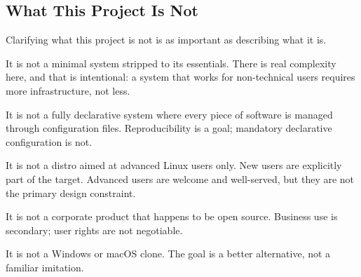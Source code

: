 \subsection{What This Project Is Not}
\label{sec:nongoals}

Clarifying what this project is not is as important as describing what it is.

It is not a minimal system stripped to its essentials. There is real complexity
here, and that is intentional: a system that works for non-technical users
requires more infrastructure, not less.

It is not a fully declarative system where every piece of software is managed
through configuration files. Reproducibility is a goal; mandatory declarative
configuration is not.

It is not a distro aimed at advanced Linux users only. New users are explicitly
part of the target. Advanced users are welcome and well-served, but they are not
the primary design constraint.

It is not a corporate product that happens to be open source. Business use is
secondary; user rights are not negotiable.

It is not a Windows or macOS clone. The goal is a better alternative, not a
familiar imitation.
